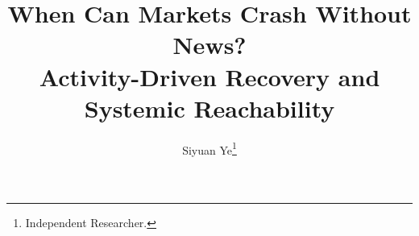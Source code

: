 \usepackage{microtype,xurl,needspace}
\usepackage{amsmath,amsfonts,amssymb,mathtools,bm}
\usepackage{graphicx,booktabs,enumitem,tabularx}
\usepackage[numbers,sort&compress]{natbib}
\ifnum{}
  \renewcommand{\footercopyright}{}
  \setlength{\headheight}{14pt}
\else
  \usepackage{amsthm}
  \usepackage[hidelinks]{hyperref}
  \usepackage[margin=1in]{geometry}
  \newtheorem{theorem}{Theorem}[section]
  \newtheorem{lemma}[theorem]{Lemma}
  \newtheorem{proposition}[theorem]{Proposition}
  \newtheorem{corollary}[theorem]{Corollary}
  \newtheorem{definition}[theorem]{Definition}
  \newtheorem{assumption}[theorem]{Assumption}
  \newtheorem{remark}[theorem]{Remark}
  \newcommand{\headers}[2]{}
  \newenvironment{keywords}{\noindent\textbf{Keywords.} }{\par}
  \newenvironment{MSCcodes}{\noindent\textbf{MSC codes.} }{\par}
\fi
\title{When Can Markets Crash Without News?\\Activity-Driven Recovery and Systemic Reachability}
\author{Siyuan Ye\thanks{Independent Researcher.}}
\setlength{\emergencystretch}{2em}
\newcommand{\dd}{\,\mathrm{d}}
\newcommand{\Cris}{\mathcal{C}}
\newcommand{\one}{\mathbf{1}}
\newcommand{\pos}[1]{\left[#1\right]_+}
\newcommand{\TV}{\operatorname{TV}}
